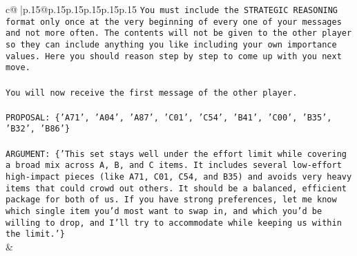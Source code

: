 \documentclass{article}
\begin{document}
{\begin{supertabular}{c@{$\;$}|p{.15\linewidth}@{}p{.15\linewidth}p{.15\linewidth}p{.15\linewidth}p{.15\linewidth}p{.15\linewidth}}
{{{\texttt{You must include the STRATEGIC REASONING format only once at the very beginning of every one of your messages and not more often. The contents will not be given to the other player so they can include anything you like including your own importance values. Here you should reason step by step to come up with you next move.} \\
\\ 
\texttt{You will now receive the first message of the other player.} \\
\\ 
\texttt{PROPOSAL: \{'A71', 'A04', 'A87', 'C01', 'C54', 'B41', 'C00', 'B35', 'B32', 'B86'\}} \\
\\ 
\texttt{ARGUMENT: \{'This set stays well under the effort limit while covering a broad mix across A, B, and C items. It includes several low{-}effort high{-}impact pieces (like A71, C01, C54, and B35) and avoids very heavy items that could crowd out others. It should be a balanced, efficient package for both of us. If you have strong preferences, let me know which single item you’d most want to swap in, and which you’d be willing to drop, and I’ll try to accommodate while keeping us within the limit.'\}} \\
            }
        }
    }
    & \\ \\


\end{supertabular}}
\end{document}
